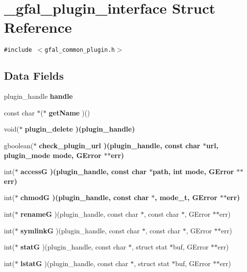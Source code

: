 \section{\_\-gfal\_\-plugin\_\-interface Struct Reference}
\label{struct__gfal__plugin__interface}
{\tt \#include $<$gfal\_\-common\_\-plugin.h$>$}

\subsection*{Data Fields}
\begin{CompactItemize}
\item 
plugin\_\-handle \textbf{handle}\label{struct__gfal__plugin__interface_510b7d8a34cd71f63211ee614ae265db}

\item 
const char $\ast$($\ast$ \textbf{get\-Name} )()\label{struct__gfal__plugin__interface_f665fe60fb0e0a7d58234b21390d8b01}

\item 
void($\ast$ \bf{plugin\_\-delete} )(plugin\_\-handle)
\item 
gboolean($\ast$ \bf{check\_\-plugin\_\-url} )(plugin\_\-handle, const char $\ast$url, plugin\_\-mode mode, GError $\ast$$\ast$err)
\item 
int($\ast$ \bf{access\-G} )(plugin\_\-handle, const char $\ast$path, int mode, GError $\ast$$\ast$err)
\item 
int($\ast$ \bf{chmod\-G} )(plugin\_\-handle, const char $\ast$, mode\_\-t, GError $\ast$$\ast$err)
\item 
int($\ast$ \textbf{rename\-G} )(plugin\_\-handle, const char $\ast$, const char $\ast$, GError $\ast$$\ast$err)\label{struct__gfal__plugin__interface_49e135ba301e599ddd6d9a634de347ac}

\item 
int($\ast$ \textbf{symlink\-G} )(plugin\_\-handle, const char $\ast$, const char $\ast$, GError $\ast$$\ast$err)\label{struct__gfal__plugin__interface_9fdf6235eccb1eb2312dc7b73b451e66}

\item 
int($\ast$ \textbf{stat\-G} )(plugin\_\-handle, const char $\ast$, struct stat $\ast$buf, GError $\ast$$\ast$err)\label{struct__gfal__plugin__interface_8db37c3af860f063277a40798821cfc2}

\item 
int($\ast$ \textbf{lstat\-G} )(plugin\_\-handle, const char $\ast$, struct stat $\ast$buf, GError $\ast$$\ast$err)\label{struct__gfal__plugin__interface_5654611b3cce424dfa4bf03a5af7bed5}


\end{CompactItemize}
